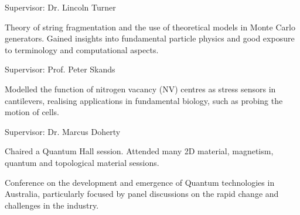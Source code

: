 \documentclass[10pt,a4paper,ragged2e,withhyper]{altacv}
\begin{document}
		\faUsers\hspace{4pt} Supervisor: Dr. Lincoln Turner
		
		\divider
		
		\vspace{-0.2em}
		Theory of string fragmentation and the use of theoretical models in Monte Carlo generators. Gained insights into fundamental particle physics and good exposure to terminology and computational aspects.
		
		\faUsers\hspace{4pt} Supervisor: Prof. Peter Skands
		
		\divider
		
		\vspace{-0.2em}
		Modelled the function of nitrogen vacancy (NV) centres as stress sensors in cantilevers, realising applications in fundamental biology, such as probing the motion of cells.
		
		\faUsers\hspace{4pt} Supervisor: Dr. Marcus Doherty
		
	\divider
	
	
		Chaired a Quantum Hall session. Attended many 2D material, magnetism, quantum and topological material sessions. 
		
		\divider
		
		Conference on the development and emergence of Quantum technologies in Australia, particularly focused by panel discussions on the rapid change and challenges in the industry.
		
\end{document}
